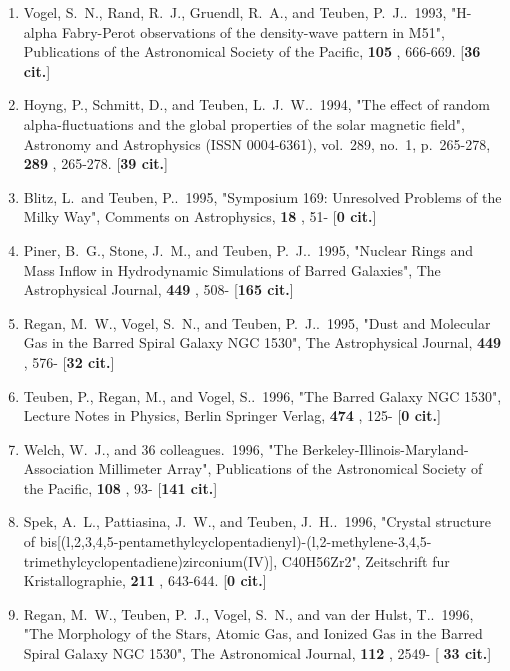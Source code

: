 \documentclass[11pt,letterpaper]{article}
\begin{document}
\begin{enumerate}[resume,label=\textbf{\arabic*}.]
\item  
Vogel, S.~N., Rand, R.~J., Gruendl, R.~A., and Teuben, P.~J..\  1993,  
"H-alpha Fabry-Perot observations of the density-wave pattern in M51", 
Publications of the Astronomical Society of the Pacific,  {\bf 105} , 
666-669.  [{\bf 36 cit.}] 

\item  
Hoyng, P., Schmitt, D., and Teuben, L.~J.~W..\  1994,  "The effect of 
random alpha-fluctuations and the global properties of the solar magnetic 
field", Astronomy and Astrophysics (ISSN 0004-6361), vol.~289, no.~1, 
p.~265-278,  {\bf 289} , 265-278.  [{\bf 39 cit.}] 

\item  
Blitz, L.~and Teuben, P..\  1995,  "Symposium 169: Unresolved Problems of 
the Milky Way", Comments on Astrophysics,  {\bf 18} , 51- [{\bf 0 cit.}] 

\item  
Piner, B.~G., Stone, J.~M., and Teuben, P.~J..\  1995,  "Nuclear Rings and 
Mass Inflow in Hydrodynamic Simulations of Barred Galaxies", The 
Astrophysical Journal,  {\bf 449} , 508- [{\bf 165 cit.}] 

\item  
Regan, M.~W., Vogel, S.~N., and Teuben, P.~J..\  1995,  "Dust and Molecular 
Gas in the Barred Spiral Galaxy NGC 1530", The Astrophysical Journal,  {\bf 
449} , 576- [{\bf 32 cit.}] 

\item  
Teuben, P., Regan, M., and Vogel, S..\  1996,  "The Barred Galaxy NGC 
1530", Lecture Notes in Physics, Berlin Springer Verlag,  {\bf 474} , 125- 
[{\bf 0 cit.}] 

\item  
Welch, W.~J., and 36 colleagues.\  1996,  "The 
Berkeley-Illinois-Maryland-Association Millimeter Array", Publications of 
the Astronomical Society of the Pacific,  {\bf 108} , 93- [{\bf 141 cit.}] 

\item  
Spek, A.~L., Pattiasina, J.~W., and Teuben, J.~H..\  1996,  "Crystal 
structure of 
bis[(l,2,3,4,5-pentamethylcyclopentadienyl)-(l,2-methylene-3,4,5-trimethylcyclopentadiene)zirconium(IV)], C40H56Zr2", Zeitschrift fur Kristallographie,  {\bf 211} , 643-644.  [{\bf 0 cit.}] 

\item  
Regan, M.~W., Teuben, P.~J., Vogel, S.~N., and van der Hulst, T..\  1996,  
"The Morphology of the Stars, Atomic Gas, and Ionized Gas in the Barred 
Spiral Galaxy NGC 1530", The Astronomical Journal,  {\bf 112} , 2549- [{\bf 
33 cit.}] 


\end{enumerate}
\end{document}
